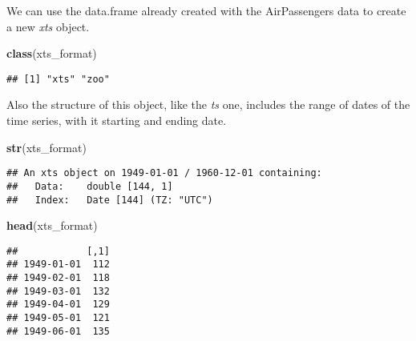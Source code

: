 \documentclass[
]{article}
\newenvironment{Shaded}{\begin{snugshade}}{\end{snugshade}}
\newcommand{\AttributeTok}[1]{\textcolor[rgb]{0.13,0.29,0.53}{#1}}
\newcommand{\DecValTok}[1]{\textcolor[rgb]{0.00,0.00,0.81}{#1}}
\newcommand{\FunctionTok}[1]{\textcolor[rgb]{0.13,0.29,0.53}{\textbf{#1}}}
\newcommand{\NormalTok}[1]{#1}
\newcommand{\OtherTok}[1]{\textcolor[rgb]{0.56,0.35,0.01}{#1}}
\newcommand{\SpecialCharTok}[1]{\textcolor[rgb]{0.81,0.36,0.00}{\textbf{#1}}}
\begin{document}
We can use the data.frame already created with the AirPassengers data to create a new \emph{xts} object.

\begin{Shaded}
\end{Shaded}

\begin{Shaded}
\begin{Highlighting}[]
\FunctionTok{class}\NormalTok{(xts\_format)}
\end{Highlighting}
\end{Shaded}

\begin{verbatim}
## [1] "xts" "zoo"
\end{verbatim}

Also the structure of this object, like the \emph{ts} one, includes the range of dates of the time series, with it starting and ending date.

\begin{Shaded}
\begin{Highlighting}[]
\FunctionTok{str}\NormalTok{(xts\_format)}
\end{Highlighting}
\end{Shaded}

\begin{verbatim}
## An xts object on 1949-01-01 / 1960-12-01 containing: 
##   Data:    double [144, 1]
##   Index:   Date [144] (TZ: "UTC")
\end{verbatim}

\begin{Shaded}
\begin{Highlighting}[]
\FunctionTok{head}\NormalTok{(xts\_format)}
\end{Highlighting}
\end{Shaded}

\begin{verbatim}
##            [,1]
## 1949-01-01  112
## 1949-02-01  118
## 1949-03-01  132
## 1949-04-01  129
## 1949-05-01  121
## 1949-06-01  135
\end{verbatim}
\end{document}
